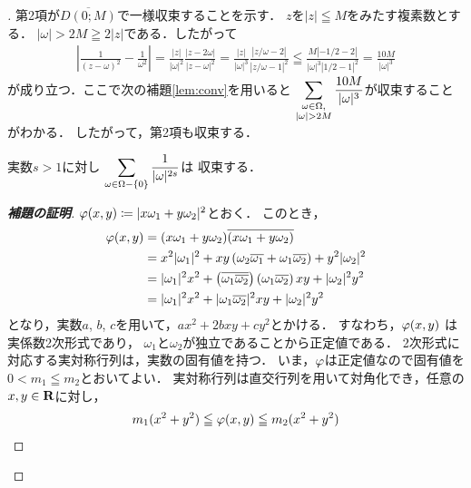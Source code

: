 \begin{proof}[\pfb]
    第2項が$\overline{D(0;M)}$で一様収束することを示す．
    $z$を$|z|\leqq M$をみたす複素数とする．
    $|\omega|>2M\geqq2|z|$である．したがって
    \begin{align*}
        \left|\frac{1}{(z-\omega)^2}-\frac{1}{\omega^2}\right|
        =\frac{|z|}{|\omega|^2}\frac{|z-2\omega|}{|z-\omega|^2}
        =\frac{|z|}{|\omega|^3}\frac{|z/\omega-2|}{|z/\omega-1|^2}
        \leqq\frac{M|-1/2-2|}{|\omega|^3|1/2-1|^2}
        =\frac{10M}{|\omega|^3}    
    \end{align*}
    が成り立つ．ここで次の補題\ref{lem:conv}を用いると
    $\dip \sum_{\substack{\omega\in\Omega,\\|\omega|>2M}}
    \frac{10M}{|\omega|^{3}}$が収束することがわかる．
    したがって，第2項も収束する．
    \begin{Lemma}\label{lem:conv}
        実数$s>1$に対し
        $\displaystyle \sum_{\omega\in\Omega-\{0\}}\frac{1}{|\omega|^{2s}}$は
        収束する．
    \end{Lemma}
    \begin{proof}[\textbf{補題の証明}]
        $\varphi(x,y)\coloneqq |x\omega_1+y\omega_2|^2$とおく．
        このとき，
        \begin{align*}
            \varphi(x,y)
            &=(x\omega_1+y\omega_2)\overline{(x\omega_1+y\omega_2)}\\
            &=x^2|\omega_1|^2+xy\left(
                \omega_2\overline{\omega_1}+\omega_1\overline{\omega_2}
                \right)+y^2|\omega_2|^2\\
            &=|\omega_1|^2x^2+\left(
                \overline{\omega_1\overline{\omega_2}}
                \right)\left(\omega_1\overline{\omega_2}
                \right)xy+|\omega_2|^2y^2\\
            &=|\omega_1|^2x^2+|\omega_1\overline{\omega_2}|^2xy+|\omega_2|^2y^2
        \end{align*}
        となり，実数$a$, $b$, $c$を用いて，$ax^2+2bxy+cy^2$とかける．
        すなわち，$\varphi(x,y)$ は実係数2次形式であり，
        $\omega_1$と$\omega_2$が独立であることから正定値である．
        2次形式に対応する実対称行列は，実数の固有値を持つ．
        いま，$\varphi$は正定値なので固有値を$0< m_1\leqq m_2$とおいてよい．
        実対称行列は直交行列を用いて対角化でき，任意の$x,y\in\mathbf{R}$に対し，
        \begin{align*}
            m_1(x^2+y^2)\leqq\varphi(x,y)\leqq m_2(x^2+y^2)
        \end{align*}

\end{proof}
\end{proof}
